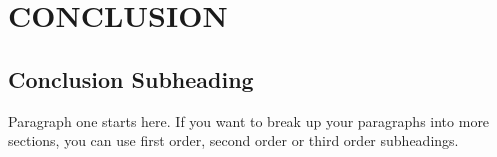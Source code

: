%
%
%

\chapter{CONCLUSION}





\section{Conclusion Subheading}

\indent \indent Paragraph one starts here. If you want to break up your paragraphs into more sections, you can use first order, second order or third order subheadings.







